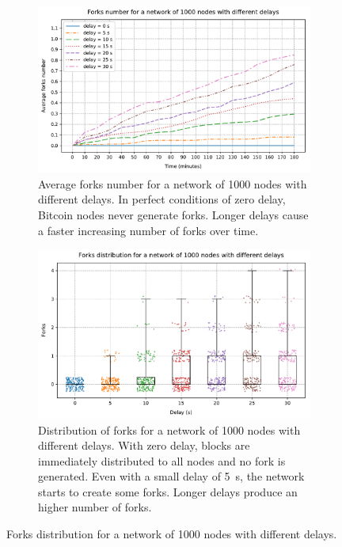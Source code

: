 \begin{figure}[ht]
	\begin{subfigure}{\textwidth}
		\centering
		\includegraphics[width=\myplotswitdth \columnwidth]{plots/forks_delay_1000_linechart}
		\vspace*{0.25cm}
		\caption{
			Average forks number for a network of \num{1000} nodes with different delays.
			In perfect conditions of zero delay, Bitcoin nodes never generate forks.
			Longer delays cause a faster increasing number of forks over time.
		}
		\vspace*{0.75cm}
	\end{subfigure}
	\begin{subfigure}{\textwidth}
		\centering
		\vspace*{0.25cm}
		\includegraphics[width=\myplotswitdth \columnwidth]{plots/forks_delay_1000_boxplot}
		\vspace*{0.25cm}
		\caption{
			Distribution of forks for a network of \num{1000} nodes with different delays.
			With zero delay, blocks are immediately distributed to all nodes and no fork is generated.
			Even with a small delay of \SI{5}{\second}, the network starts to create some forks.
			Longer delays produce an higher number of forks.
		}
		\vspace*{0.25cm}
	\end{subfigure}
	\caption[Forks distribution for a network of 1000 nodes with different delays]{
		Forks distribution for a network of \num{1000} nodes with different delays.
	}
	\label{fig:forks-delay-1000}
\end{figure}

